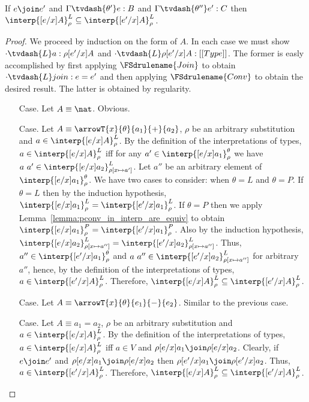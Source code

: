 \begin{lemma}
  \label{lemma:lconv_in_interp_are_equiv}
  If $e \join e'$ and $\Gamma \tvdash{\theta'} e:B$ and $\Gamma \tvdash{\theta''} e':C$ then 
  $\interp{[e/x]A}^L_\rho \subseteq \interp{[e'/x]A}^L_\rho$.
\end{lemma}
\begin{proof}
  We proceed by induction on the form of $A$.  In each case we must show 
  $\cdot \tvdash{L} a:\rho[e'/x]A$ and $\cdot \tvdash{L} \rho[e'/x]A:[[Type]]$.  The former is easly 
  accomplished by first applying $\FSdrulename{Join}$ to obtain $\cdot \tvdash{L} join:e = e'$ 
  and then applying $\FSdrulename{Conv}$ to obtain the desired result.  The latter is obtained
  by regularity.
  
  \begin{itemize}
  \item[Case.] Let $A \equiv \nat$.  Obvious.
    
  \item[Case.] Let $A \equiv \arrowT{x}{\theta}{a_1}{+}{a_2}$, $\rho$ be an arbitrary 
    substitution and $a \in \interp{[e/x]A}^L_\rho$.  By the definition of the interpretations 
    of types,
    $a \in \interp{[e/x]A}^L_\rho$ iff for any 
    $a' \in \interp{[e/x]a_1}^\theta_\rho$ we have
    $a\ a' \in \interp{[e/x]a_2}^L_{\rho[x \mapsto a']}$.
    Let $a''$ be an arbitrary element of $\interp{[e/x]a_1}^\theta_\rho$. We have two cases
    to consider: when $\theta = L$ and $\theta = P$.  If $\theta = L$ then by the induction 
    hypothesis, 
    $\interp{[e/x]a_1}^L_\rho = \interp{[e'/x]a_1}^L_\rho$.  
    If $\theta = P$ then we apply  
    Lemma~\ref{lemma:pconv_in_interp_are_equiv} to obtain 
    $\interp{[e/x]a_1}^P_\rho = \interp{[e'/x]a_1}^P_\rho$.
    Also by the induction hypothesis,
    $\interp{[e/x]a_2}^L_{\rho[x \mapsto a'']} = \interp{[e'/x]a_2}^L_{\rho[x \mapsto a'']}$.  
    Thus, 
    $a'' \in \interp{[e'/x]a_1}^\theta_\rho$ and
    $a\ a'' \in \interp{[e'/x]a_2}^L_{\rho[x \mapsto a'']}$ for arbitrary $a''$, hence,
    by the definition of the interpretations of types,
    $a \in \interp{[e'/x]A}^L_\rho$.  Therefore, 
    $\interp{[e/x]A}^L_\rho \subseteq \interp{[e'/x]A}^L_\rho$.
    
  \item[Case.]  Let $A \equiv \arrowT{x}{\theta}{e_1}{-}{e_2}$.  Similar to the previous case.
    
  \item[Case.] Let $A \equiv a_1 = a_2$, $\rho$ be an arbitrary 
    substitution and $a \in \interp{[e/x]A}^L_\rho$.
    By the definition of the interpretations of types,
    $a \in \interp{[e/x]A}^L_\rho$ iff $a \in V$ and 
    $\rho[e/x]a_1 \join \rho[e/x]a_2$.
    Clearly, if $e \join e'$ and $\rho[e/x]a_1 \join \rho[e/x]a_2$ then 
    $\rho[e'/x]a_1 \join \rho[e'/x]a_2$.
    Thus, $a \in \interp{[e'/x]A}^L_\rho$.  Therefore,
    $\interp{[e/x]A}^L_\rho \subseteq \interp{[e'/x]A}^L_\rho$.
  \end{itemize}
\end{proof}
